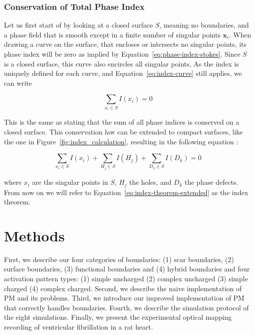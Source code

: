 \documentclass[twocolumn]{article}
\begin{document}
\subsubsection{Conservation of Total Phase Index}

Let us first start of by looking at a closed surface $S$, meaning no boundaries,
and a phase field that is smooth except in a finite number of singular points $\bm{x}_i$.
When drawing a curve on the surface,
that encloses or intersects no singular points,
its phase index will be zero as implied by Equation~\ref{eq:phase-index-stokes}.
Since \(S\) is a closed surface, this curve also encircles all singular points,
As the index is uniquely defined for each curve,
and Equation~\ref{eq:index-curve} still applies,
we can write

\begin{equation}
  \sum_{x_i \in S} I(x_i) = 0
  \label{eq:index-theorem}
\end{equation}

\noindent This is the same as stating that the sum of all phase indices is
conserved on a closed surface.
This conservation law can be extended to compact surfaces, like the one in Figure~\ref{fig:index_calculation},
resulting in the following equation \autocite{herlin2012reconstruction, davidsen2004topological}:

\begin{equation}
  \sum_{x_i \in S} I(x_i) + \sum_{H_j \in S} I(H_j) + \sum_{D_k \in S} I(D_k)  = 0
  \label{eq:index-theorem-extended}
\end{equation}

\noindent where \(x_i\) are the singular points in \(S\),
\(H_j\) the holes,
and \(D_k\) the phase defects.
From now on we will refer to Equation~\ref{eq:index-theorem-extended} as the index theorem.

\section{Methods}

First, we describe our four categories of boundaries: (1) scar boundaries, (2) surface boundaries, (3) functional boundaries and (4) hybrid boundaries and four activation pattern types: (1) simple uncharged (2) complex uncharged (3) simple charged (4) complex charged.
Second, we describe the naive implementation of PM and its problems. Third, we introduce our improved implementation of PM that correctly handles boundaries. Fourth, we describe the simulation protocol of the eight simulations. Finally, we present the experimental optical mapping recording of ventricular fibrillation in a rat heart.
\end{document}

